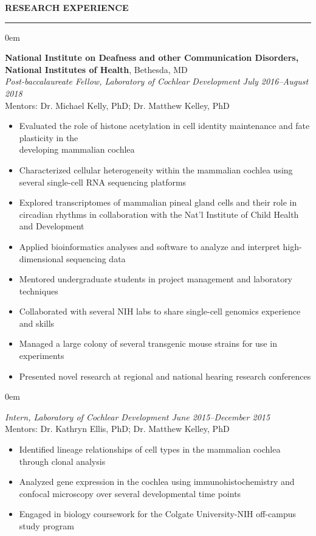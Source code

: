 \documentclass[11pt, letterpaper]{article}
\newenvironment{CVSection}{
\begin{addmargin}[2em]{0em}
\begin{samepage}}
{\end{samepage}
\end{addmargin}\bigskip}
\newcommand{\CVHeading}[1]{
\MakeUppercase{\bf #1}
\smallskip
\hrule
\medskip
}
\begin{document}
\CVHeading{Research Experience}
\begin{CVSection}
\textbf{National Institute on Deafness and other Communication Disorders,\\National Institutes of Health}, Bethesda, MD\\
\textsl{Post-baccalaureate Fellow, Laboratory of Cochlear Development	\hfill July 2016--August 2018\\}
Mentors: Dr. Michael Kelly, PhD; Dr. Matthew Kelley, PhD
\begin{itemize}
\item Evaluated the role of histone acetylation in cell identity maintenance and fate plasticity in the\\ developing mammalian cochlea
\item Characterized cellular heterogeneity within the mammalian cochlea using several single-cell RNA sequencing platforms
\item Explored transcriptomes of mammalian pineal gland cells and their role in circadian rhythms in collaboration with the Nat'l Institute of Child Health and Development
\item Applied bioinformatics analyses and software to analyze and interpret high-dimensional sequencing data
\item Mentored undergraduate students in project management and laboratory techniques
\item Collaborated with several NIH labs to share single-cell genomics experience and skills
\item Managed a large colony of several transgenic mouse strains for use in experiments
\item Presented novel research at regional and national hearing research conferences
\end{itemize}
\end{CVSection}
\begin{CVSection}
\textsl{Intern, Laboratory of Cochlear Development	\hfill June 2015--December 2015\\}
Mentors: Dr. Kathryn Ellis, PhD; Dr. Matthew Kelley, PhD
\begin{itemize}
\item Identified lineage relationships of cell types in the mammalian cochlea through clonal analysis
\item Analyzed gene expression in the cochlea using immunohistochemistry and confocal microscopy over several developmental time points
\item Engaged in biology coursework for the Colgate University-NIH off-campus study program
\end{itemize}
\end{CVSection}
\end{document}
